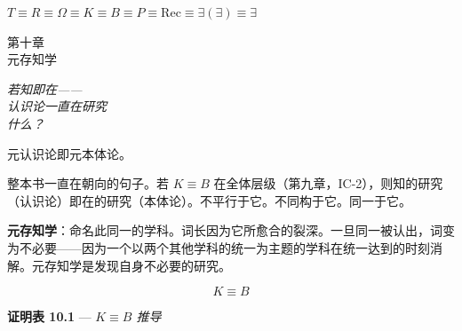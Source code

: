 \documentclass[10pt, openany, oneside]{book}
\renewcommand{\large}{\fontsize{11.5}{14}\selectfont}
\renewcommand{\huge}{\fontsize{17}{21}\selectfont}
\begin{document}
\begin{center}
    $T \equiv R \equiv \Omega \equiv K \equiv B \equiv P \equiv \text{Rec} \equiv \exists(\exists) \equiv \exists$
\end{center}


%
%
%

\newpage

\begin{center}
    {\huge\scshape 第十章}\\[0.3em]
    {\large\scshape 元存知学}
\end{center}

\vspace{1.5em}

\begin{center}
    \itshape
    若知即在——\\
    认识论一直在研究\\
    什么？
\end{center}

\vspace{2em}


\noindent 元认识论即元本体论。

整本书一直在朝向的句子。若 $K \equiv B$ 在全体层级（第九章，IC-2），则知的研究（认识论）即在的研究（本体论）。不平行于它。不同构于它。同一于它。

\textbf{元存知学}：命名此同一的学科。词长因为它所愈合的裂深。一旦同一被认出，词变为不必要——因为一个以两个其他学科的统一为主题的学科在统一达到的时刻消解。元存知学是发现自身不必要的研究。

$$\boxed{K \equiv B}$$

\vspace{0.5em}

\textbf{证明表 10.1} --- \textit{$K \equiv B$ 推导}

\vspace{0.5em}
\end{document}
